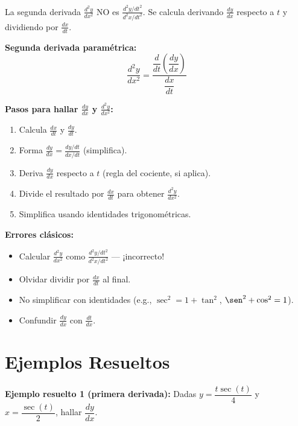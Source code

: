 \documentclass[12pt, letterpaper]{article}
\begin{document}
La segunda derivada $\frac{d^2y}{dx^2}$ NO es $\frac{d^2y/dt^2}{d^2x/dt^2}$. Se calcula derivando $\frac{dy}{dx}$ respecto a $t$ y dividiendo por $\frac{dx}{dt}$.

\begin{cuadroteoria}
  \textbf{Segunda derivada paramétrica:}
  \[
    \frac{d^2y}{dx^2} = \frac{\dfrac{d}{dt}\left(\dfrac{dy}{dx}\right)}{\dfrac{dx}{dt}}
  \]
\end{cuadroteoria}

\begin{cuadropasos}
  \textbf{Pasos para hallar $\frac{dy}{dx}$ y $\frac{d^2y}{dx^2}$:}
  \begin{enumerate}
    \item Calcula $\frac{dx}{dt}$ y $\frac{dy}{dt}$.
    \item Forma $\frac{dy}{dx} = \frac{dy/dt}{dx/dt}$ (simplifica).
    \item Deriva $\frac{dy}{dx}$ respecto a $t$ (regla del cociente, si aplica).
    \item Divide el resultado por $\frac{dx}{dt}$ para obtener $\frac{d^2y}{dx^2}$.
    \item Simplifica usando identidades trigonométricas.
  \end{enumerate}
\end{cuadropasos}

\begin{cuadroadvertencia}
  \textbf{Errores clásicos:}
  \begin{itemize}
    \item Calcular $\frac{d^2y}{dx^2}$ como $\frac{d^2y/dt^2}{d^2x/dt^2}$ — ¡incorrecto!
    \item Olvidar dividir por $\frac{dx}{dt}$ al final.
    \item No simplificar con identidades (e.g., $\sec^2 = 1 + \tan^2$, $\sen^2 + \cos^2 = 1$).
    \item Confundir $\frac{dy}{dx}$ con $\frac{dt}{dx}$.
  \end{itemize}
\end{cuadroadvertencia}

\newpage
\section{Ejemplos Resueltos}

\noindent\textbf{Ejemplo resuelto 1 (primera derivada):} Dadas $y = \dfrac{t\sec(t)}{4}$ y $x = \dfrac{\sec(t)}{2}$, hallar $\dfrac{dy}{dx}$.
\end{document}
